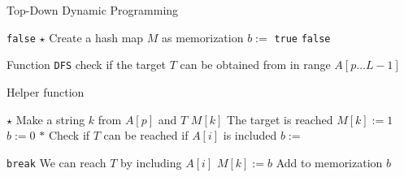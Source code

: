 \setcounter{algorithm}{0}
\begin{algorithm}[H]
\caption{Top-Down Dynamic Programming}
\begin{algorithmic}[1]
\State \Return \texttt{false}
\EndIf
\State $\star$ Create a hash map $M$ as memorization
\State $b:=$
\State \Return \texttt{true}
\Else
\State \Return \texttt{false}
\EndIf
\EndProcedure
\end{algorithmic}
\end{algorithm}

Function \texttt{DFS} check if the target $ T $ can be obtained from in range $A[p\ldots L-1]$

\begin{algorithm}[H]
\caption{Helper function}
\begin{algorithmic}[1]
\State {}
\EndIf
\State $\star$ Make a string $k$ from $A[p]$ and $T$
\State \Return $M[k]$
\EndIf
{} \Comment The target is reached
\State $M[k]:=1$
\State {}
\EndIf
\State $b:=0$
\State $\ast$ Check if $T$ can be reached if $A[i]$ is included
\State $b:=$
\end{algorithmic}
\end{algorithm}
\begin{algorithm}[H]
\begin{algorithmic}[1]
\State \texttt{break} \Comment We can reach $T$ by including $A[i]$
\EndIf
\EndFor
\State $M[k]:=b$ \Comment Add to memorization
\State \Return $b$
\EndProcedure
\end{algorithmic}
\end{algorithm}

